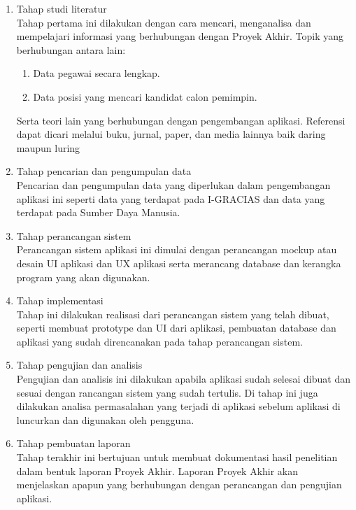 \begin{enumerate}
	\item Tahap studi literatur \\
	Tahap pertama ini dilakukan dengan cara mencari, menganalisa dan 		mempelajari informasi yang berhubungan dengan Proyek Akhir. Topik yang berhubungan antara lain: 
	\begin{enumerate}
	\item Data pegawai secara lengkap.
	\item Data posisi yang mencari kandidat calon pemimpin. 
	\end{enumerate}
	Serta teori lain yang berhubungan dengan pengembangan aplikasi. Referensi dapat dicari melalui buku, jurnal, paper, dan media lainnya baik daring maupun luring
	\item	Tahap pencarian dan pengumpulan data \\
	Pencarian dan pengumpulan data yang diperlukan dalam pengembangan aplikasi ini seperti data yang terdapat pada I-GRACIAS dan data yang terdapat pada Sumber Daya Manusia.
	\\
	\item	Tahap perancangan sistem \\
	Perancangan sistem aplikasi ini dimulai dengan perancangan mockup atau desain UI aplikasi dan UX aplikasi serta merancang database dan kerangka program yang akan digunakan.
	\item Tahap implementasi \\
	Tahap ini dilakukan realisasi dari perancangan sistem yang telah dibuat, seperti membuat prototype dan UI dari aplikasi, pembuatan database dan aplikasi yang sudah direncanakan pada tahap perancangan sistem.
	\item Tahap pengujian dan analisis \\
	Pengujian dan analisis ini dilakukan apabila aplikasi sudah selesai dibuat dan sesuai dengan rancangan sistem yang sudah tertulis. Di tahap ini juga dilakukan analisa permasalahan yang terjadi di aplikasi sebelum aplikasi di luncurkan dan digunakan oleh pengguna.
	\item	Tahap pembuatan laporan \\
	Tahap terakhir ini bertujuan untuk membuat dokumentasi hasil penelitian dalam bentuk laporan Proyek Akhir. Laporan Proyek Akhir akan menjelaskan apapun yang berhubungan dengan perancangan dan pengujian aplikasi.  
	
\end{enumerate}


